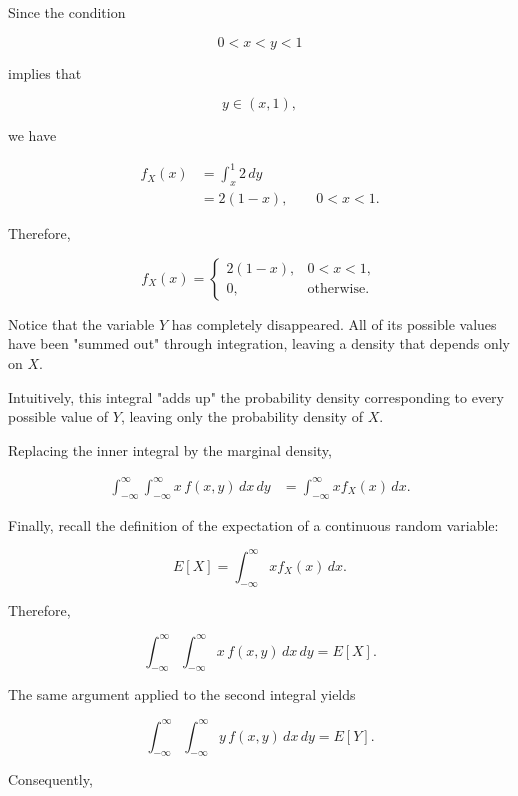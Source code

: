 \documentclass[11pt]{article}
\begin{document}
\begin{mdframed}[
		linewidth=0.8pt,
		roundcorner=6pt,
		backgroundcolor=gray!5,
		linecolor=gray!60,
		innertopmargin=10pt,
		innerbottommargin=10pt,
		innerleftmargin=10pt,
		innerrightmargin=10pt
		]
		Since the condition
		
		\[
		0<x<y<1
		\]
		
		implies that
		
		\[
		y
		\in
		(x,1),
		\]
		
		we have
		
		\[
		\begin{aligned}
			f_X(x)
			&=
			\int_x^1
			2
			\,dy
			\\[0.3cm]
			&=
			2(1-x),
			\qquad
			0<x<1.
		\end{aligned}
		\]
		
		Therefore,
		
		\[
		\boxed{
			f_X(x)
			=
			\begin{cases}
				2(1-x),
				&
				0<x<1,
				\\[0.2cm]
				0,
				&
				\text{otherwise.}
			\end{cases}
		}
		\]
		
		Notice that the variable \(Y\) has completely disappeared. All of its
		possible values have been "summed out" through integration, leaving a
		density that depends only on \(X\).
		
		Intuitively, this integral "adds up" the probability density corresponding
		to every possible value of \(Y\), leaving only the probability density of
		\(X\).
		
		Replacing the inner integral by the marginal density,
		
		\[
		\begin{aligned}
			\int_{-\infty}^{\infty}
			\int_{-\infty}^{\infty}
			x\,f(x,y)
			\,dx\,dy
			&=
			\int_{-\infty}^{\infty}
			x
			f_X(x)
			\,dx.
		\end{aligned}
		\]
		
		\bigskip
		
		Finally, recall the definition of the expectation of a continuous random
		variable:
		
		\[
		E[X]
		=
		\int_{-\infty}^{\infty}
		x
		f_X(x)
		\,dx.
		\]
		
		Therefore,
		
		\[
		\boxed{
			\int_{-\infty}^{\infty}
			\int_{-\infty}^{\infty}
			x\,f(x,y)
			\,dx\,dy
			=
			E[X].
		}
		\]
		
		The same argument applied to the second integral yields
		
		\[
		\boxed{
			\int_{-\infty}^{\infty}
			\int_{-\infty}^{\infty}
			y\,f(x,y)
			\,dx\,dy
			=
			E[Y].
		}
		\]
		
		Consequently,
		

\end{mdframed}
\end{document}

